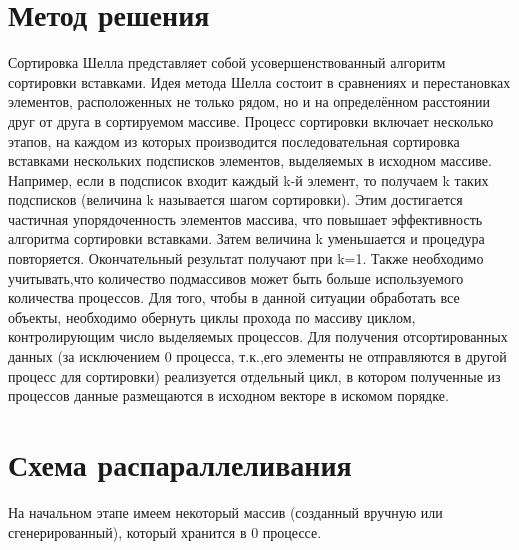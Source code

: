 \documentclass[12pt, letterpaper]{report}
\begin{document}
\chapter*{Метод решения}
Сортировка Шелла представляет собой усовершенствованный алгоритм сортировки
вставками. Идея метода Шелла состоит в сравнениях и перестановках элементов,
расположенных не только рядом, но и на определённом расстоянии друг от друга в
сортируемом массиве. Процесс сортировки включает несколько этапов, на каждом из
которых производится последовательная сортировка вставками нескольких подсписков
элементов, выделяемых в исходном массиве. Например, если в подсписок входит
каждый k-й элемент, то получаем k таких подсписков (величина k называется шагом
сортировки). Этим достигается частичная упорядоченность элементов массива, что
повышает эффективность алгоритма сортировки вставками. Затем величина k
уменьшается и процедура повторяется. Окончательный результат получают при k=1.
Также необходимо учитывать,что количество подмассивов может быть больше
используемого количества процессов. Для того, чтобы в данной ситуации обработать
все объекты, необходимо обернуть циклы прохода по массиву циклом,
контролирующим число выделяемых процессов.
Для получения отсортированных данных (за исключением 0 процесса, т.к.,его
элементы не отправляются в другой процесс для сортировки) реализуется отдельный
цикл, в котором полученные из процессов данные размещаются в исходном векторе в
искомом порядке.

\chapter*{Схема распараллеливания}
На начальном этапе имеем некоторый массив (созданный вручную или
сгенерированный), который хранится в 0 процессе.
\end{document}
